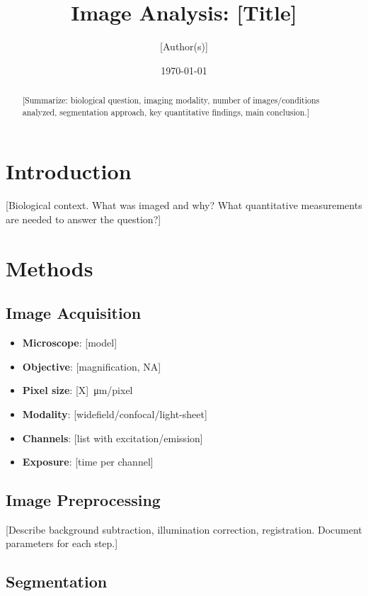 \documentclass[11pt,a4paper]{article}
\title{Image Analysis: [Title]}
\author{[Author(s)]}
\date{\today}
\begin{document}
\maketitle

\begin{abstract}
[Summarize: biological question, imaging modality, number of images/conditions analyzed,
segmentation approach, key quantitative findings, main conclusion.]
\end{abstract}

\section{Introduction}

[Biological context. What was imaged and why? What quantitative measurements
are needed to answer the question?]

\section{Methods}

\subsection{Image Acquisition}

\begin{itemize}
    \item \textbf{Microscope}: [model]
    \item \textbf{Objective}: [magnification, NA]
    \item \textbf{Pixel size}: \SI{[X]}{\micro\meter/pixel}
    \item \textbf{Modality}: [widefield/confocal/light-sheet]
    \item \textbf{Channels}: [list with excitation/emission]
    \item \textbf{Exposure}: [time per channel]
\end{itemize}

\subsection{Image Preprocessing}

[Describe background subtraction, illumination correction, registration.
Document parameters for each step.]

\subsection{Segmentation}
\end{document}
